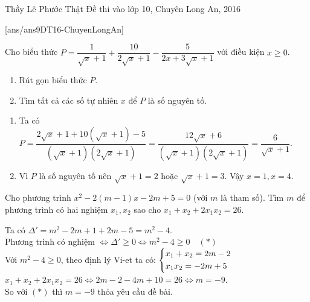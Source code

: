 \begin{name}
{Thầy  Lê Phước Thật}
{Đề thi vào lớp 10, Chuyên Long An, 2016}
\end{name}
\setcounter{ex}{0}
[ans/ans9DT16-ChuyenLongAn]

\begin{ex}%
Cho biểu thức $P=\dfrac{1}{\sqrt{x}+1}+\dfrac{10}{2\sqrt{x}+1}-\dfrac{5}{2x+3\sqrt{x}+1}$ với điều kiện $x\ge 0$.
\begin{enumerate}
\item Rút gọn biểu thức $P$.
\item Tìm tất cả các số tự nhiên $x$ để $P$ là số nguyên tố.
\end{enumerate} 
\loigiai
{
\begin{enumerate}
\item Ta có $P = \dfrac{{2\sqrt x  + 1 + 10\left( {\sqrt x  + 1} \right) - 5}}{{\left( {\sqrt x  + 1} \right)\left( {2\sqrt x  + 1} \right)}} = \dfrac{12\sqrt x  + 6}{\left( {\sqrt x  + 1} \right)\left( {2\sqrt x  + 1} \right)}=\dfrac{6}{\sqrt{x}+1}$.
\item Vì $P$  là số nguyên tố nên $\sqrt{x}+1=2$ hoặc $\sqrt{x}+1=3$. Vậy $x=1, x=4$.
\end{enumerate}
}
\end{ex}

\begin{ex}%
Cho phương trình $x^2-2(m-1)x-2m+5=0$ (với $m$ là tham số).
Tìm $m$ để phương trình có hai nghiệm $x_1,x_2$ sao cho $x_1+x_2+2x_1x_2=26$.
\loigiai
{Ta có $\Delta '=m^2-2m+1+2m-5=m^2-4$.\\
Phương trình có nghiệm  $\Leftrightarrow \Delta '\ge 0 \Leftrightarrow m^2-4\ge 0 \quad (*)$\\
Với $m^2-4\ge 0$, theo định lý Vi-et ta có: $\left\{\begin{aligned}&x_1+x_2=2m-2 \\ &x_1x_2=-2m+5 \end{aligned}\right.$\\
$x_1+x_2+2x_1x_2=26\Leftrightarrow 2m-2-4m+10=26\Leftrightarrow m=-9$.\\
So với $(*)$ thì $m=-9$ thỏa yêu cầu đề bài.

}
\end{ex}

